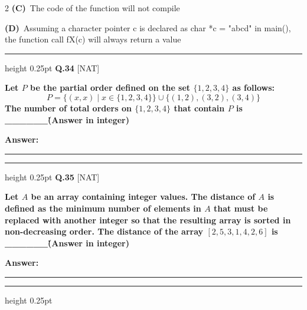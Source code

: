 \documentclass[a4paper,10pt,twoside]{article}
\begin{document}
\begin{multicols}{2}
\textbf{(C)}~The code of the function will not compile\par\vspace{2pt}\noindent
\textbf{(D)}~Assuming a character pointer c is declared as char *c = "abcd" in main(), the function call fX(c) will always return a value
\par\vspace{6pt}\hrule height 0.25pt\vspace{6pt}
\noindent\textbf{Q.34} \hfill {\footnotesize\textsf{[NAT]}}
\par\vspace{2pt}
{\bfseries Let $P$ be the partial order defined on the set $\{1,2,3,4\}$ as follows:
\[ P = \{(x, x) \mid x \in \{1,2,3,4\}\} \cup \{(1,2), (3,2), (3,4)\} \]
The number of total orders on $\{1,2,3,4\}$ that contain $P$ is \_\_\_\_\_\_\. (Answer in integer) \par}
\par\vspace{3pt}\noindent\textbf{Answer:} \rule{3.2cm}{0.4pt}
\par\vspace{6pt}\hrule height 0.25pt\vspace{6pt}
\noindent\textbf{Q.35} \hfill {\footnotesize\textsf{[NAT]}}
\par\vspace{2pt}
{\bfseries Let $A$ be an array containing integer values. The distance of $A$ is defined as the minimum number of elements in $A$ that must be replaced with another integer so that the resulting array is sorted in non-decreasing order. The distance of the array $[2, 5, 3, 1, 4, 2, 6]$ is \_\_\_\_\_\_\. (Answer in integer) \par}
\par\vspace{3pt}\noindent\textbf{Answer:} \rule{3.2cm}{0.4pt}
\par\vspace{6pt}\hrule height 0.25pt\vspace{6pt}

\vspace{6pt}
\vspace{3pt}


\end{multicols}
\end{document}
